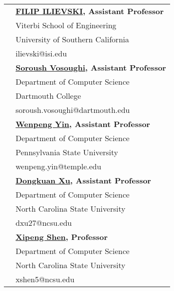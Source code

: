 \documentclass[letterpaper, 10pt]{article}
\begin{document}
\begin{longtable}{p{1.3in}p{4.8in}}

{\color{black}{References}} 
& \textbf{\href{https://usc-isi-i2.github.io/ilievski/}{FILIP ILIEVSKI}, Assistant Professor}\\
&  Viterbi School of Engineering \\
&  University of Southern California \\
&  ilievski@isi.edu \\

& \textbf{\href{https://www.cs.dartmouth.edu/~soroush//}{Soroush Vosoughi}, Assistant Professor}\\
&  Department of Computer Science \\
&  Dartmouth College \\
&  soroush.vosoughi@dartmouth.edu \\

& \textbf{\href{https://www.wenpengyin.org/}{Wenpeng Yin}, Assistant Professor}\\
&  Department of Computer Science \\
&  Pennsylvania State University \\
&  wenpeng.yin@temple.edu \\

& \textbf{\href{http://personal.psu.edu/dux19/}{Dongkuan Xu}, Assistant Professor}\\
&  Department of Computer Science \\
&  North Carolina State University \\
&  dxu27@ncsu.edu \\

& \textbf{\href{https://people.engr.ncsu.edu/xshen5/}{Xipeng Shen}, Professor}\\
&  Department of Computer Science \\
&  North Carolina State University \\
&  xshen5@ncsu.edu \\







\end{longtable}
\end{document}

